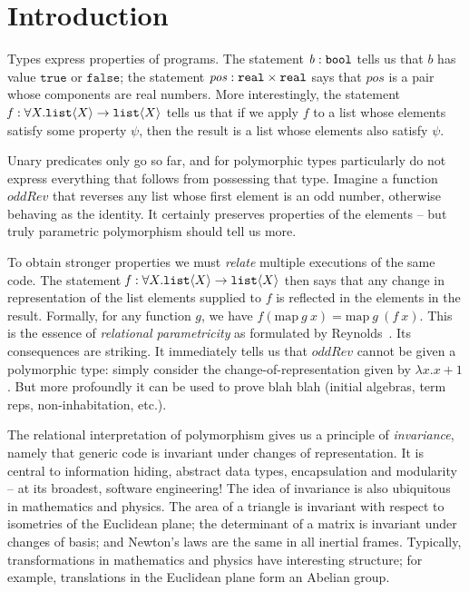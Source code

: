 \section{Introduction}
\label{sec:introduction}
Types express properties of programs. The statement $\mathit{b}: \texttt{bool}$ tells
us that $\mathit{b}$ has value $\mathtt{true}$ or $\mathtt{false}$;
the statement $\mathit{pos}:\texttt{real}\times\texttt{real}$ says that
$\mathit{pos}$ is a pair whose components are real numbers. More interestingly,
the statement $\mathit{f} : \forall X. \texttt{list}\langle X \rangle\to\texttt{list}\langle X \rangle$ tells us that
if we apply $\mathit{f}$ to a list whose elements satisfy some property $\psi$, 
then the result is a list whose elements also satisfy $\psi$.

Unary predicates only go so far, and for polymorphic types
particularly do not express everything that follows from possessing that type. 
Imagine a function $\mathit{oddRev}$ that reverses any list whose first element
is an odd number, otherwise behaving as the identity. It certainly
preserves properties of the elements -- but truly parametric
polymorphism should tell us more.

To obtain stronger properties we must \emph{relate} multiple
executions of the same code. The statement $\mathit{f}:\forall
X. \texttt{list}\langle X \rangle\to\texttt{list}\langle X \rangle$ then says that any change in
representation of the list elements supplied to $\mathit{f}$ is
reflected in the elements in the result.  Formally, for any function
$g$, we have $\mathit{f}(\mathrm{map}\:\mathit{g}\:\mathit{x}) =
\mathrm{map}\:\mathit{g}\:(\mathit{f}\:\mathit{x})$.  This is the
essence of \emph{relational parametricity} as formulated by
Reynolds~\cite{reynolds83types}. Its consequences are striking.  It
immediately tells us that $\mathit{oddRev}$ cannot be given a
polymorphic type: simply consider the change-of-representation given
by $\lambda x. x+1$.  But more profoundly it can be used to prove blah
blah (initial algebras, term reps, non-inhabitation, etc.).

The relational interpretation of polymorphism gives us a principle of
\emph{invariance}, namely that generic code is invariant under changes of
representation. It is central to information hiding, abstract data
types, encapsulation and modularity -- at its broadest, software
engineering!  The idea of invariance is also ubiquitous in mathematics
and physics.  The area of a triangle is invariant with respect to
isometries of the Euclidean plane; the determinant of a matrix is
invariant under changes of basis; and Newton's laws are the same in all
inertial frames.  Typically, transformations in mathematics and
physics have interesting structure; for example, translations in the Euclidean plane
form an Abelian group.

